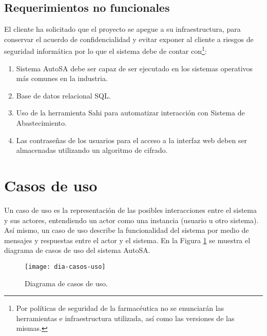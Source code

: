 \subsection{Requerimientos no funcionales}\label{sec:nonfunctional-req}
El cliente ha solicitado que el proyecto se apegue a su infraestructura, para conservar el acuerdo de confidencialidad y evitar exponer al cliente a riesgos de seguridad informática por lo que el sistema debe de contar con\footnote{Por políticas de seguridad de la farmacéutica no se enunciarán las herramientas e infraestructura utilizada, así como las versiones de las mismas.}:
\begin{enumerate}
\item Sistema AutoSA debe ser capaz de ser ejecutado en los sistemas operativos más comunes en la industria.
\item Base de datos relacional SQL.
\item Uso de la herramienta Sahi para automatizar interacción con Sistema de Abastecimiento.
\item Las contraseñas de los usuarios para el acceso a la interfaz web deben ser almacenadas utilizando un algoritmo de cifrado.
\end{enumerate}




\section{Casos de uso}\label{sec:casos-uso}
Un caso de uso es la representación de las posibles interacciones entre el sistema y sus actores, entendiendo un actor como una instancia (usuario u otro sistema). Así mismo, un caso de uso describe la funcionalidad del sistema por medio de mensajes y respuestas entre el actor y el sistema\cite{ApressSE}. En la Figura \ref{fig:dia-casos-uso} se muestra el diagrama de casos de uso del sistema AutoSA.

\begin{figure}[h]
  \centering
  \texttt{[image: dia-casos-uso]} 
  \caption{Diagrama de casos de uso.}
  \label{fig:dia-casos-uso}
\end{figure}

